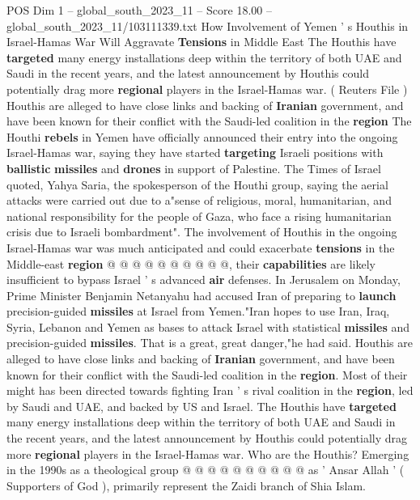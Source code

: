 \begin{textsample}{POS Dim 1 – global\_south\_2023\_11 – Score 18.00 – global\_south\_2023\_11/103111339.txt}  \label{ex:f1_pos_229}
How Involvement of Yemen ' s Houthis in Israel-Hamas War Will Aggravate \textbf{Tensions} in Middle East The Houthis have \textbf{targeted} many energy installations deep within the territory of both UAE and Saudi in the recent years, and the latest announcement by Houthis could potentially drag more \textbf{regional} players in the Israel-Hamas war. ( Reuters File ) Houthis are alleged to have close links and backing of \textbf{Iranian} government, and have been known for their conflict with the Saudi-led coalition in the \textbf{region} The Houthi \textbf{rebels} in Yemen have officially announced their entry into the ongoing Israel-Hamas war, saying they have started \textbf{targeting} Israeli positions with \textbf{ballistic} \textbf{missiles} and \textbf{drones} in support of Palestine.
The Times of Israel quoted, Yahya Saria, the spokesperson of the Houthi group, saying the aerial attacks were carried out due to a"sense of religious, moral, humanitarian, and national responsibility for the people of Gaza, who face a rising humanitarian crisis due to Israeli bombardment".
The involvement of Houthis in the ongoing Israel-Hamas war was much anticipated and could exacerbate \textbf{tensions} in the Middle-east \textbf{region} @ @ @ @ @ @ @ @ @ @, their \textbf{capabilities} are likely insufficient to bypass Israel ' s advanced \textbf{air} defenses.
In Jerusalem on Monday, Prime Minister Benjamin Netanyahu had accused Iran of preparing to \textbf{launch} precision-guided \textbf{missiles} at Israel from Yemen."Iran hopes to use Iran, Iraq, Syria, Lebanon and Yemen as bases to attack Israel with statistical \textbf{missiles} and precision-guided \textbf{missiles}.
That is a great, great danger,"he had said.
Houthis are alleged to have close links and backing of \textbf{Iranian} government, and have been known for their conflict with the Saudi-led coalition in the \textbf{region}.
Most of their might has been directed towards fighting Iran ' s rival coalition in the \textbf{region}, led by Saudi and UAE, and backed by US and Israel.
The Houthis have \textbf{targeted} many energy installations deep within the territory of both UAE and Saudi in the recent years, and the latest announcement by Houthis could potentially drag more \textbf{regional} players in the Israel-Hamas war.
Who are the Houthis?
Emerging in the 1990s as a theological group @ @ @ @ @ @ @ @ @ @ as ' Ansar Allah ' ( Supporters of God ), primarily represent the Zaidi branch of Shia Islam.

\end{textsample}
